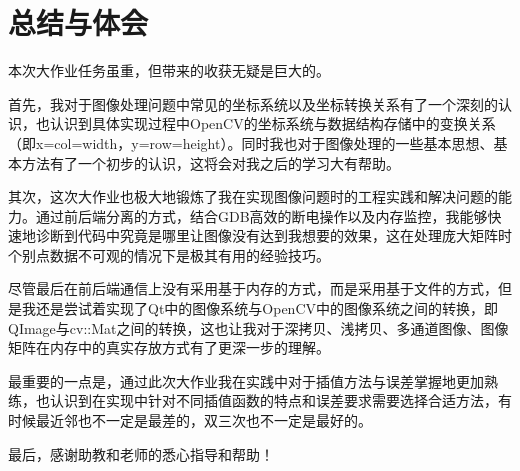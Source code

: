 \documentclass[UTF8]{ctexart}
\begin{document}
\section{总结与体会}
本次大作业任务虽重，但带来的收获无疑是巨大的。

首先，我对于图像处理问题中常见的坐标系统以及坐标转换关系有了一个深刻的认识，也认识到具体实现过程中OpenCV的坐标系统与数据结构存储中的变换关系（即x=col=width，y=row=height）。同时我也对于图像处理的一些基本思想、基本方法有了一个初步的认识，这将会对我之后的学习大有帮助。

其次，这次大作业也极大地锻炼了我在实现图像问题时的工程实践和解决问题的能力。通过前后端分离的方式，结合GDB高效的断电操作以及内存监控，我能够快速地诊断到代码中究竟是哪里让图像没有达到我想要的效果，这在处理庞大矩阵时个别点数据不可观的情况下是极其有用的经验技巧。

尽管最后在前后端通信上没有采用基于内存的方式，而是采用基于文件的方式，但是我还是尝试着实现了Qt中的图像系统与OpenCV中的图像系统之间的转换，即QImage与cv::Mat之间的转换，这也让我对于深拷贝、浅拷贝、多通道图像、图像矩阵在内存中的真实存放方式有了更深一步的理解。

最重要的一点是，通过此次大作业我在实践中对于插值方法与误差掌握地更加熟练，也认识到在实现中针对不同插值函数的特点和误差要求需要选择合适方法，有时候最近邻也不一定是最差的，双三次也不一定是最好的。

最后，感谢助教和老师的悉心指导和帮助！
\end{document}
